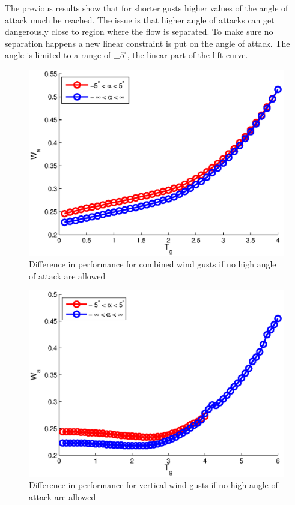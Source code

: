 The previous results show that for shorter gusts higher values of the angle of attack much be reached.
The issue is that higher angle of attacks can get dangerously close to region where the flow is separated.
To make sure no separation happens a new linear constraint is put on the angle of attack.
The angle is limited to a range of $\pm 5 ^{\circ}$, the linear part of the lift curve.


\begin{figure}[h]
  \centering
 \includegraphics{./Figures/allowed_alpha_wg_tg_wt=3.eps}
  \caption{Difference in performance for combined wind gusts if no high angle of attack are allowed}
  \label{fig:allowed_alpha_Wt_vs_tg_wt=3}
\end{figure}

\begin{figure}[h]
  \centering
 \includegraphics{./Figures/allowed_alpha_wg_tg_wt=1.eps}
  \caption{Difference in performance for vertical wind gusts if no high angle of attack are allowed}
  \label{fig:allowed_alpha_Wt_vs_tg_wt=1}
\end{figure}


